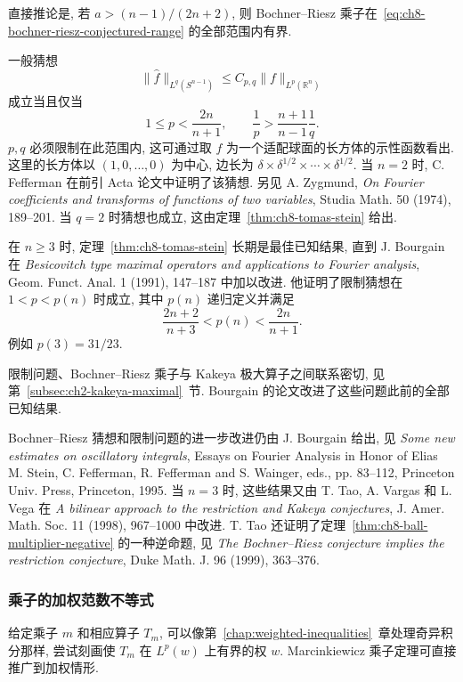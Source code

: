 直接推论是, 若 $a>(n-1)/(2n+2)$, 则 Bochner--Riesz 乘子在~\eqref{eq:ch8-bochner-riesz-conjectured-range} 的全部范围内有界.

一般猜想
\begin{equation}
 \|\widehat f\|_{L^q(S^{n-1})}
 \le C_{p,q}\|f\|_{L^p(\mathbb R^n)}
 \label{eq:ch8-general-restriction}
\end{equation}
成立当且仅当
\[
 1\le p<\frac{2n}{n+1},
 \qquad
 \frac1p>\frac{n+1}{n-1}\frac1q.
\]
$p,q$ 必须限制在此范围内, 这可通过取 $f$ 为一个适配球面的长方体的示性函数看出. 这里的长方体以 $(1,0,\ldots,0)$ 为中心, 边长为 $\delta\times\delta^{1/2}\times\cdots\times\delta^{1/2}$. 当 $n=2$ 时, C. Fefferman 在前引 Acta 论文中证明了该猜想. 另见 A. Zygmund, \textit{On Fourier coefficients and transforms of functions of two variables}, Studia Math. 50 (1974), 189--201. 当 $q=2$ 时猜想也成立, 这由定理~\ref{thm:ch8-tomas-stein} 给出.

在 $n\ge3$ 时, 定理~\ref{thm:ch8-tomas-stein} 长期是最佳已知结果, 直到 J. Bourgain 在 \textit{Besicovitch type maximal operators and applications to Fourier analysis}, Geom. Funct. Anal. 1 (1991), 147--187 中加以改进. 他证明了限制猜想在 $1<p<p(n)$ 时成立, 其中 $p(n)$ 递归定义并满足
\[
 \frac{2n+2}{n+3}<p(n)<\frac{2n}{n+1}.
\]
例如 $p(3)=31/23$.

\hypertarget{chapter-08-page-202}{}
限制问题、Bochner--Riesz 乘子与 Kakeya 极大算子之间联系密切, 见第~\ref{subsec:ch2-kakeya-maximal}~节. Bourgain 的论文改进了这些问题此前的全部已知结果.

Bochner--Riesz 猜想和限制问题的进一步改进仍由 J. Bourgain 给出, 见 \textit{Some new estimates on oscillatory integrals}, Essays on Fourier Analysis in Honor of Elias M. Stein, C. Fefferman, R. Fefferman and S. Wainger, eds., pp. 83--112, Princeton Univ. Press, Princeton, 1995. 当 $n=3$ 时, 这些结果又由 T. Tao, A. Vargas 和 L. Vega 在 \textit{A bilinear approach to the restriction and Kakeya conjectures}, J. Amer. Math. Soc. 11 (1998), 967--1000 中改进. T. Tao 还证明了定理~\ref{thm:ch8-ball-multiplier-negative} 的一种逆命题, 见 \textit{The Bochner--Riesz conjecture implies the restriction conjecture}, Duke Math. J. 96 (1999), 363--376.

\subsubsection{乘子的加权范数不等式}
\label{subsec:ch8-weighted-multipliers}

给定乘子 $m$ 和相应算子 $T_m$, 可以像第~\ref{chap:weighted-inequalities}~章处理奇异积分那样, 尝试刻画使 $T_m$ 在 $L^p(w)$ 上有界的权 $w$. Marcinkiewicz 乘子定理可直接推广到加权情形.

